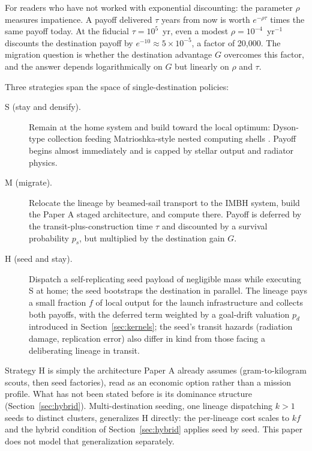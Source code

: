 \documentclass[11pt]{article}
\begin{document}
For readers who have not worked with exponential discounting: the parameter $\rho$ measures impatience. A payoff delivered $\tau$ years from now is worth $e^{-\rho\tau}$ times the same payoff today. At the fiducial $\tau = 10^{5}$~yr, even a modest $\rho = 10^{-4}$~yr$^{-1}$ discounts the destination payoff by $e^{-10} \approx 5\times10^{-5}$, a factor of 20{,}000. The migration question is whether the destination advantage $G$ overcomes this factor, and the answer depends logarithmically on $G$ but linearly on $\rho$ and $\tau$.

Three strategies span the space of single-destination policies:

\begin{description}
\item[S (stay and densify).] Remain at the home system and build toward the local optimum: Dyson-type collection feeding Matrioshka-style nested computing shells \citep{Dyson1960,Bradbury1999}. Payoff begins almost immediately and is capped by stellar output and radiator physics.
\item[M (migrate).] Relocate the lineage by beamed-sail transport \citep{Lubin2016} to the IMBH system, build the Paper A staged architecture, and compute there. Payoff is deferred by the transit-plus-construction time $\tau$ and discounted by a survival probability $p_{s}$, but multiplied by the destination gain $G$.
\item[H (seed and stay).] Dispatch a self-replicating seed payload \citep{Freitas1980,Armstrong2013} of negligible mass while executing S at home; the seed bootstraps the destination in parallel. The lineage pays a small fraction $f$ of local output for the launch infrastructure and collects both payoffs, with the deferred term weighted by a goal-drift valuation $p_{d}$ introduced in Section~\ref{sec:kernels}; the seed's transit hazards (radiation damage, replication error) also differ in kind from those facing a deliberating lineage in transit.
\end{description}

Strategy H is simply the architecture Paper A already assumes (gram-to-kilogram scouts, then seed factories), read as an economic option rather than a mission profile. What has not been stated before is its dominance structure (Section~\ref{sec:hybrid}). Multi-destination seeding, one lineage dispatching $k > 1$ seeds to distinct clusters, generalizes H directly: the per-lineage cost scales to $kf$ and the hybrid condition of Section~\ref{sec:hybrid} applies seed by seed. This paper does not model that generalization separately.
\end{document}
